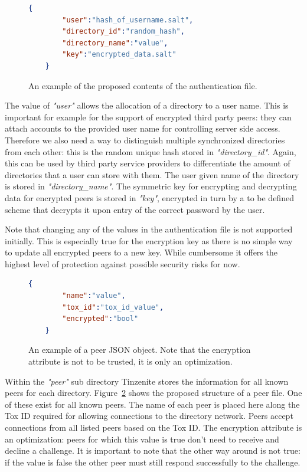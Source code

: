 \begin{figure}[htp]
    \begin{lstlisting}[language=json,firstnumber=0]
    {
        "user":"hash_of_username.salt",
        "directory_id":"random_hash",
        "directory_name":"value",
        "key":"encrypted_data.salt"
    }
    \end{lstlisting}
\caption[Authentication JSON Object]{An example of the proposed contents of the authentication file.}
\label{json:auth_object}
\end{figure}

The value of \textit{"user"} allows the allocation of a directory to a user name.
This is important for example for the support of encrypted third party peers: they can attach accounts to the provided user name for controlling server side access.
Therefore we also need a way to distinguish multiple synchronized directories from each other: this is the random unique hash stored in \textit{"directory\_id"}.
Again, this can be used by third party service providers to differentiate the amount of directories that a user can store with them.
The user given name of the directory is stored in \textit{"directory\_name"}.
The symmetric key for encrypting and decrypting data for encrypted peers is stored in \textit{"key"}, encrypted in turn by a to be defined scheme that decrypts it upon entry of the correct password by the user.

Note that changing any of the values in the authentication file is not supported initially.
This is especially true for the encryption key as there is no simple way to update all encrypted peers to a new key.
While cumbersome it offers the highest level of protection against possible security risks for now.

\begin{figure}[htp]
    \begin{lstlisting}[language=json,firstnumber=0]
    {
        "name":"value",
        "tox_id":"tox_id_value",
        "encrypted":"bool"
    }
    \end{lstlisting}
\caption[Peer JSON Object]{An example of a peer JSON object. Note that the encryption attribute is not to be trusted, it is only an optimization.}
\label{json:peer_object}
\end{figure}

Within the \textit{"peer"} sub directory Tinzenite stores the information for all known peers for each directory.
Figure~\ref{json:peer_object} shows the proposed structure of a peer file.
One of these exist for all known peers.
The name of each peer is placed here along the Tox ID required for allowing connections to the directory network.
Peers accept connections from all listed peers based on the Tox ID.
The encryption attribute is an optimization: peers for which this value is true don't need to receive and decline a challenge.
It is important to note that the other way around is not true: if the value is false the other peer must still respond successfully to the challenge.

